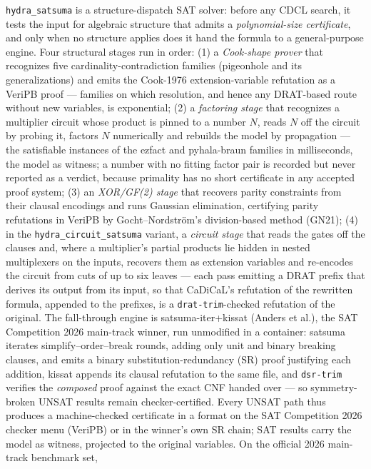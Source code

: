 \documentclass[10pt]{article}
\begin{document}
\texttt{hydra\_satsuma} is a structure-dispatch SAT solver: before any
CDCL search, it tests the input for algebraic structure that admits a
\emph{polynomial-size certificate}, and only when no structure applies
does it hand the formula to a general-purpose engine. Four structural
stages run in order: (1) a \emph{Cook-shape prover} that recognizes
five cardinality-contradiction families (pigeonhole and its
generalizations) and emits the Cook-1976 extension-variable refutation
as a VeriPB proof --- families on which resolution, and hence any
DRAT-based route without new variables, is exponential; (2) a
\emph{factoring stage} that recognizes a multiplier circuit whose
product is pinned to a number $N$, reads $N$ off the circuit by probing
it, factors $N$ numerically and rebuilds the model by propagation ---
the satisfiable instances of the ezfact and pyhala-braun families in
milliseconds, the model as witness; a number with no fitting factor
pair is recorded but never reported as a verdict, because primality has
no short certificate in any accepted proof system; (3) an
\emph{XOR/GF(2) stage} that recovers parity constraints from their
clausal encodings and runs Gaussian elimination, certifying parity
refutations in VeriPB by Gocht--Nordstr\"om's division-based method
(GN21); (4) in the \texttt{hydra\_circuit\_satsuma} variant, a
\emph{circuit stage} that reads the gates off the clauses and, where a
multiplier's partial products lie hidden in nested multiplexers on the
inputs, recovers them as extension variables and re-encodes the circuit
from cuts of up to six leaves --- each pass emitting a DRAT prefix that
derives its output from its input, so that CaDiCaL's refutation of the
rewritten formula, appended to the prefixes, is a
\texttt{drat-trim}-checked refutation of the original. The fall-through
engine is satsuma-iter+kissat (Anders et al.), the SAT Competition
2026 main-track winner, run unmodified in a container: satsuma
iterates simplify--order--break rounds, adding only unit and binary
breaking clauses, and emits a binary substitution-redundancy (SR)
proof justifying each addition, kissat appends its clausal
refutation to the same file, and \texttt{dsr-trim} verifies the
\emph{composed} proof against the exact CNF handed over --- so
symmetry-broken UNSAT results remain checker-certified. Every
UNSAT path thus produces a machine-checked certificate in a format on
the SAT Competition 2026 checker menu (VeriPB) or in the winner's own
SR chain; SAT results carry the model as witness, projected to the
original variables. On the official 2026 main-track benchmark set,
\end{document}
